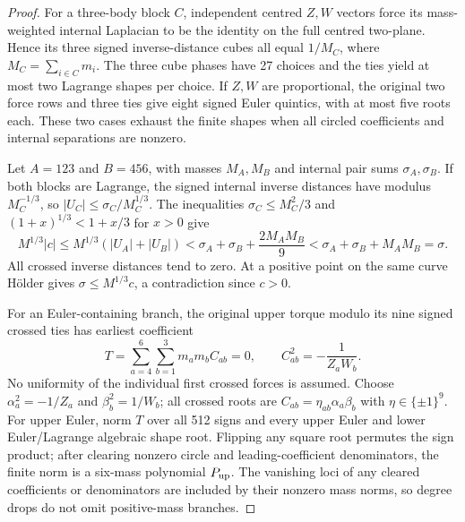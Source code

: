 \documentclass[11pt]{amsart}
\theoremstyle{remark}
\begin{document}
\begin{proof}
For a three-body block $C$, independent centred $Z,W$ vectors force its mass-weighted internal Laplacian to be the identity on the full centred two-plane. Hence its three signed inverse-distance cubes all equal $1/M_C$, where $M_C=\sum_{i\in C}m_i$. The three cube phases have 27 choices and the ties yield at most two Lagrange shapes per choice. If $Z,W$ are proportional, the original two force rows and three ties give eight signed Euler quintics, with at most five roots each. These two cases exhaust the finite shapes when all circled coefficients and internal separations are nonzero.

Let $A=123$ and $B=456$, with masses $M_A,M_B$ and internal pair sums $\sigma_A,\sigma_B$. If both blocks are Lagrange, the signed internal inverse distances have modulus $M_C^{-1/3}$, so $|U_C|\le\sigma_C/M_C^{1/3}$. The inequalities $\sigma_C\le M_C^2/3$ and $(1+x)^{1/3}<1+x/3$ for $x>0$ give
\begin{equation}\label{eq:no98-lagrange-gap}
M^{1/3}|c|\le M^{1/3}(|U_A|+|U_B|)
<\sigma_A+\sigma_B+\frac{2M_AM_B}{9}
<\sigma_A+\sigma_B+M_AM_B=\sigma.
\end{equation}
All crossed inverse distances tend to zero. At a positive point on the same curve H\"older gives $\sigma\le M^{1/3}c$, a contradiction since $c>0$.

For an Euler-containing branch, the original upper torque modulo its nine signed crossed ties has earliest coefficient
\begin{equation}\label{eq:no98-torque}
T=\sum_{a=4}^6\sum_{b=1}^3m_am_bC_{ab}=0,
\qquad C_{ab}^2=-\frac1{Z_aW_b}.
\end{equation}
No uniformity of the individual first crossed forces is assumed. Choose $\alpha_a^2=-1/Z_a$ and $\beta_b^2=1/W_b$; all crossed roots are $C_{ab}=\eta_{ab}\alpha_a\beta_b$ with $\eta\in\{\pm1\}^9$. For upper Euler, norm $T$ over all 512 signs and every upper Euler and lower Euler/Lagrange algebraic shape root. Flipping any square root permutes the sign product; after clearing nonzero circle and leading-coefficient denominators, the finite norm is a six-mass polynomial $P_{\rm up}$. The vanishing loci of any cleared coefficients or denominators are included by their nonzero mass norms, so degree drops do not omit positive-mass branches.


\end{proof}
\end{document}
